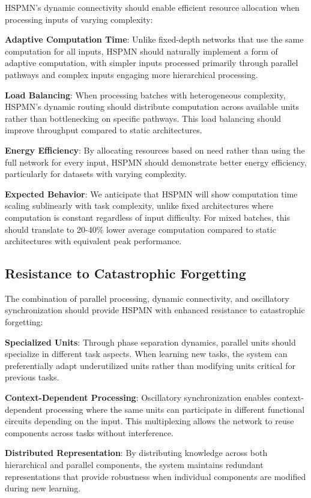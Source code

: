 \documentclass[11pt,a4paper,twocolumn]{article}
\begin{document}
HSPMN's dynamic connectivity should enable efficient resource allocation when processing inputs of varying complexity:

\textbf{Adaptive Computation Time}: Unlike fixed-depth networks that use the same computation for all inputs, HSPMN should naturally implement a form of adaptive computation, with simpler inputs processed primarily through parallel pathways and complex inputs engaging more hierarchical processing.

\textbf{Load Balancing}: When processing batches with heterogeneous complexity, HSPMN's dynamic routing should distribute computation across available units rather than bottlenecking on specific pathways. This load balancing should improve throughput compared to static architectures.

\textbf{Energy Efficiency}: By allocating resources based on need rather than using the full network for every input, HSPMN should demonstrate better energy efficiency, particularly for datasets with varying complexity.

\textbf{Expected Behavior}: We anticipate that HSPMN will show computation time scaling sublinearly with task complexity, unlike fixed architectures where computation is constant regardless of input difficulty. For mixed batches, this should translate to 20-40\% lower average computation compared to static architectures with equivalent peak performance.

\subsection{Resistance to Catastrophic Forgetting}

The combination of parallel processing, dynamic connectivity, and oscillatory synchronization should provide HSPMN with enhanced resistance to catastrophic forgetting:

\textbf{Specialized Units}: Through phase separation dynamics, parallel units should specialize in different task aspects. When learning new tasks, the system can preferentially adapt underutilized units rather than modifying units critical for previous tasks.

\textbf{Context-Dependent Processing}: Oscillatory synchronization enables context-dependent processing where the same units can participate in different functional circuits depending on the input. This multiplexing allows the network to reuse components across tasks without interference.

\textbf{Distributed Representation}: By distributing knowledge across both hierarchical and parallel components, the system maintains redundant representations that provide robustness when individual components are modified during new learning.
\end{document}
